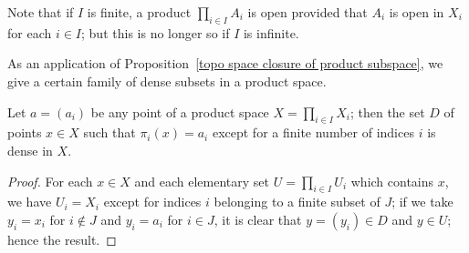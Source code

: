 \begin{remark}
Note that if $I$ is finite, a product $\prod_{i\in I}A_i$ is open provided that $A_i$ is open in $X_i$ for each $i\in I$; but this is no longer so if $I$ is infinite.
\end{remark}
As an application of Proposition~\ref{topo space closure of product subspace}, we give a certain family of dense subsets in a product space.
\begin{proposition}\label{topo space dense subset in product}
Let $a=(a_i)$ be any point of a product space $X=\prod_{i\in I}X_i$; then the set $D$ of points $x\in X$ such that $\pi_i(x)=a_i$ except for a finite number of indices $i$ is dense in $X$.
\end{proposition}
\begin{proof}
For each $x\in X$ and each elementary set $U=\prod_{i\in I}U_i$ which contains $x$, we have $U_i=X_i$ except for indices $i$ belonging to a finite subset of $J$; if we take $y_i=x_i$ for $i\notin J$ and $y_i=a_i$ for $i\in J$, it is clear that $y=(y_i)\in D$ and $y\in U$; hence the result.
\end{proof}
